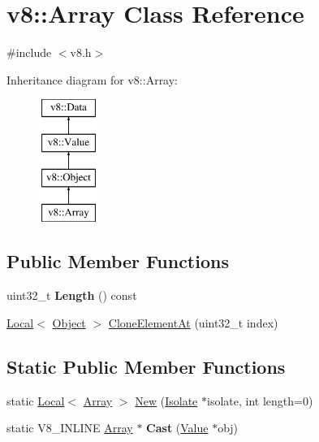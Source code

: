 \hypertarget{classv8_1_1Array}{}\section{v8\+:\+:Array Class Reference}
\label{classv8_1_1Array}


{\ttfamily \#include $<$v8.\+h$>$}

Inheritance diagram for v8\+:\+:Array\+:\begin{figure}[H]
\begin{center}
\leavevmode
\includegraphics[height=4.000000cm]{classv8_1_1Array}
\end{center}
\end{figure}
\subsection*{Public Member Functions}
\begin{DoxyCompactItemize}
\item 
\hypertarget{classv8_1_1Array_a3c47dfd8d26e60ed4fcdc683034d6d9c}{}uint32\+\_\+t {\bfseries Length} () const \label{classv8_1_1Array_a3c47dfd8d26e60ed4fcdc683034d6d9c}

\item 
\hyperlink{classv8_1_1Local}{Local}$<$ \hyperlink{classv8_1_1Object}{Object} $>$ \hyperlink{classv8_1_1Array_a7335096a5349ce75b38d5b24af4bd125}{Clone\+Element\+At} (uint32\+\_\+t index)
\end{DoxyCompactItemize}
\subsection*{Static Public Member Functions}
\begin{DoxyCompactItemize}
\item 
static \hyperlink{classv8_1_1Local}{Local}$<$ \hyperlink{classv8_1_1Array}{Array} $>$ \hyperlink{classv8_1_1Array_a892f18fe6a25dfc0bc7b435759a30226}{New} (\hyperlink{classv8_1_1Isolate}{Isolate} $\ast$isolate, int length=0)
\item 
\hypertarget{classv8_1_1Array_ae56792766f8513395c3ebe8c29afde4b}{}static V8\+\_\+\+I\+N\+L\+I\+N\+E \hyperlink{classv8_1_1Array}{Array} $\ast$ {\bfseries Cast} (\hyperlink{classv8_1_1Value}{Value} $\ast$obj)\label{classv8_1_1Array_ae56792766f8513395c3ebe8c29afde4b}

\end{DoxyCompactItemize}


